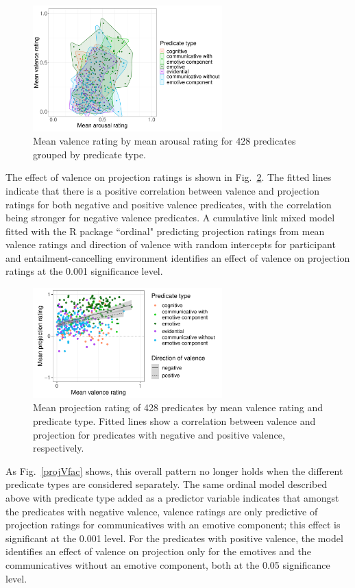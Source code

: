 \documentclass[11pt,fleqn]{article}
\newcommand{\figref}[1]{Fig.~\ref{#1}}
\newcommand{\6}{\mbox{$[\hspace*{-.6mm}[$}}
\newcommand{\9}{\mbox{$]\hspace*{-.6mm}]$}}
\begin{document}
\begin{figure}[H]
	\centering
	\includegraphics[width=0.65\textwidth]{valence-by-arousal}
	\caption{Mean valence rating by mean arousal rating for 428 predicates grouped by predicate type.}
	\label{VAgroups}
\end{figure}

The effect of valence on projection ratings is shown in \figref{projVdir}. The fitted lines indicate that there is a positive correlation between valence and projection ratings for both negative and positive valence predicates, with the correlation being stronger for negative valence predicates. A cumulative link mixed model fitted with the R package ``ordinal" predicting projection ratings from mean valence ratings and direction of valence with random intercepts for participant and entailment-cancelling environment identifies an effect of valence on projection ratings at the 0.001 significance level.

\begin{figure}[H]
	\centering
	\includegraphics[width=0.65\textwidth]{projection-by-valence-with-direction}
	\caption{Mean projection rating of 428 predicates by mean valence rating and predicate type. Fitted lines show a correlation between valence and projection for predicates with negative and positive valence, respectively.}
	\label{projVdir}
\end{figure}

As \figref{projVfac} shows, this overall pattern no longer holds when the different predicate types are considered separately. The same ordinal model described above with predicate type added as a predictor variable indicates that amongst the predicates with negative valence, valence ratings are only predictive of projection ratings for communicatives with an emotive component; this effect is significant at the 0.001 level. For the predicates with positive valence, the model identifies an effect of valence on projection only for the emotives and the communicatives without an emotive component, both at the 0.05 significance level.
\end{document}
